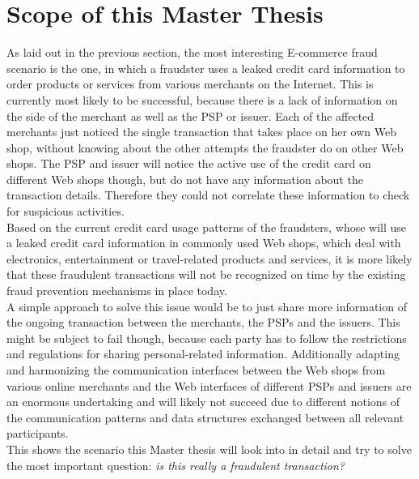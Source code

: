 
\section{Scope of this Master Thesis}
\label{sec:scope_thesis}

As laid out in the previous section, the most interesting E-commerce fraud scenario is the one, in which a fraudster uses a leaked credit card information to order products or services from various merchants on the Internet. This is currently most likely to be successful, because there is a lack of information on the side of the merchant as well as the \gls{PSP} or issuer. Each of the affected merchants just noticed the single transaction that takes place on her own Web shop, without knowing about the other attempts the fraudster do on other Web shops. The \gls{PSP} and issuer will notice the active use of the credit card on different Web shops though, but do not have any information about the transaction details. Therefore they could not correlate these information to check for suspicious activities. \\

Based on the current credit card usage patterns of the fraudsters, whose will use a leaked credit card information in commonly used Web shops, which deal with electronics, entertainment or travel-related products and services, it is more likely that these fraudulent transactions will not be recognized on time by the existing fraud prevention mechanisms in place today. \\

A simple approach to solve this issue would be to just share more information of the ongoing transaction between the merchants, the \gls{PSP}s and the issuers. This might be subject to fail though, because each party has to follow the restrictions and regulations for sharing personal-related information. Additionally adapting and harmonizing the communication interfaces between the Web shops from various online merchants and the Web interfaces of different \gls{PSP}s and issuers are an enormous undertaking and will likely not succeed due to different notions of the communication patterns and data structures exchanged between all relevant participants. \\

This shows the scenario this Master thesis will look into in detail and try to solve the most important question: \textit{is this really a fraudulent transaction?} \\

